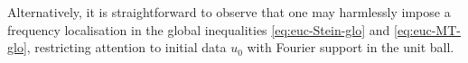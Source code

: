 \documentclass[11pt,reqno]{amsart}
\numberwithin{equation}{section}
\newcommand{\dd}{\,\mathrm{d}}
\renewcommand{\leq}{\leqslant}
\renewcommand{\le}{\leqslant}
\renewcommand{\geq}{\geqslant}
\begin{document}
Alternatively, it is straightforward to observe that one may harmlessly impose a frequency localisation in the global inequalities \eqref{eq:euc-Stein-glo} and \eqref{eq:euc-MT-glo}, restricting attention to initial data $u_0$ with Fourier support in the unit ball.
\end{document}
